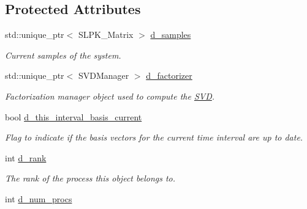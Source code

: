 \subsection*{Protected Attributes}
\begin{DoxyCompactItemize}
\item 
\hypertarget{class_c_a_r_o_m_1_1_static_s_v_d_a9c41d5d0f382d40e30052faae9d8ed53}{std\-::unique\-\_\-ptr$<$ S\-L\-P\-K\-\_\-\-Matrix $>$ \hyperlink{class_c_a_r_o_m_1_1_static_s_v_d_a9c41d5d0f382d40e30052faae9d8ed53}{d\-\_\-samples}}\label{class_c_a_r_o_m_1_1_static_s_v_d_a9c41d5d0f382d40e30052faae9d8ed53}

\begin{DoxyCompactList}\small\item\em Current samples of the system. \end{DoxyCompactList}\item 
\hypertarget{class_c_a_r_o_m_1_1_static_s_v_d_ab190353592dfd9c6ba6ceb3853e5d3a7}{std\-::unique\-\_\-ptr$<$ S\-V\-D\-Manager $>$ \hyperlink{class_c_a_r_o_m_1_1_static_s_v_d_ab190353592dfd9c6ba6ceb3853e5d3a7}{d\-\_\-factorizer}}\label{class_c_a_r_o_m_1_1_static_s_v_d_ab190353592dfd9c6ba6ceb3853e5d3a7}

\begin{DoxyCompactList}\small\item\em Factorization manager object used to compute the \hyperlink{class_c_a_r_o_m_1_1_s_v_d}{S\-V\-D}. \end{DoxyCompactList}\item 
\hypertarget{class_c_a_r_o_m_1_1_static_s_v_d_a807ec34cff9fe5e62ae2f84cd8dad151}{bool \hyperlink{class_c_a_r_o_m_1_1_static_s_v_d_a807ec34cff9fe5e62ae2f84cd8dad151}{d\-\_\-this\-\_\-interval\-\_\-basis\-\_\-current}}\label{class_c_a_r_o_m_1_1_static_s_v_d_a807ec34cff9fe5e62ae2f84cd8dad151}

\begin{DoxyCompactList}\small\item\em Flag to indicate if the basis vectors for the current time interval are up to date. \end{DoxyCompactList}\item 
\hypertarget{class_c_a_r_o_m_1_1_static_s_v_d_a1454841fa7e3afaae10f52583ef4b8fe}{int \hyperlink{class_c_a_r_o_m_1_1_static_s_v_d_a1454841fa7e3afaae10f52583ef4b8fe}{d\-\_\-rank}}\label{class_c_a_r_o_m_1_1_static_s_v_d_a1454841fa7e3afaae10f52583ef4b8fe}

\begin{DoxyCompactList}\small\item\em The rank of the process this object belongs to. \end{DoxyCompactList}\item 
\hypertarget{class_c_a_r_o_m_1_1_static_s_v_d_ad3e3b35402a5ef9813dd9a0d403e2212}{int \hyperlink{class_c_a_r_o_m_1_1_static_s_v_d_ad3e3b35402a5ef9813dd9a0d403e2212}{d\-\_\-num\-\_\-procs}}\label{class_c_a_r_o_m_1_1_static_s_v_d_ad3e3b35402a5ef9813dd9a0d403e2212}


\end{DoxyCompactItemize}

